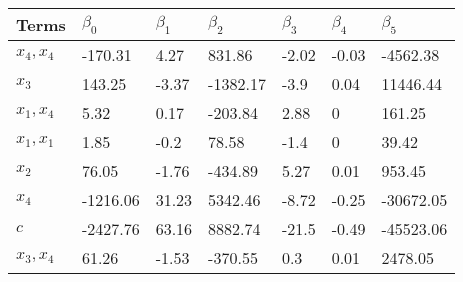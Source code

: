 \begin{tabular}{lllllll}
Terms & $\beta_0$ & $\beta_1$ & $\beta_2$ & $\beta_3$ & $\beta_4$ & $\beta_5$ \\ 
\hline 
$x_4,x_4$ & -170.31 & 4.27 & 831.86 & -2.02 & -0.03 & -4562.38 \\ 
$x_3$ & 143.25 & -3.37 & -1382.17 & -3.9 & 0.04 & 11446.44 \\ 
$x_1,x_4$ & 5.32 & 0.17 & -203.84 & 2.88 & 0 & 161.25 \\ 
$x_1,x_1$ & 1.85 & -0.2 & 78.58 & -1.4 & 0 & 39.42 \\ 
$x_2$ & 76.05 & -1.76 & -434.89 & 5.27 & 0.01 & 953.45 \\ 
$x_4$ & -1216.06 & 31.23 & 5342.46 & -8.72 & -0.25 & -30672.05 \\ 
$c$ & -2427.76 & 63.16 & 8882.74 & -21.5 & -0.49 & -45523.06 \\ 
$x_3,x_4$ & 61.26 & -1.53 & -370.55 & 0.3 & 0.01 & 2478.05 \\ 
\hline 
\end{tabular}